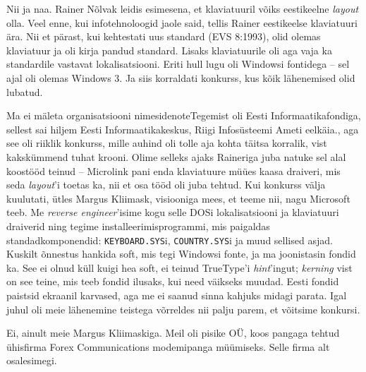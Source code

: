 
Nii ja naa. Rainer Nõlvak leidis esimesena, et klaviatuuril võiks eestikeelne \emph{layout} 
olla. Veel enne, kui infotehnoloogid jaole said, tellis Rainer eestikeelse 
klaviatuuri ära.  Nii et pärast, kui kehtestati  uus standard (EVS 8:1993),  
olid olemas klaviatuur ja oli kirja pandud standard. Lisaks klaviatuurile oli aga vaja ka standardile vastavat 
lokalisatsiooni. Eriti hull lugu oli Windowsi fontidega -- sel ajal oli olemas
Windows 3. Ja siis korraldati konkurss, kus kõik lähenemised 
olid lubatud.


Ma ei mäleta organisatsiooni nimesidenote{Tegemist oli Eesti Informaatikafondiga, sellest sai hiljem Eesti Informaatikakeskus, Riigi Infosüsteemi Ameti eelkäia.}, aga see oli riiklik 
konkurss, mille auhind oli tolle aja kohta täitsa korralik, vist kakskümmend 
tuhat krooni. Olime selleks ajaks Raineriga juba natuke sel alal 
koostööd teinud -- Microlink pani enda klaviatuure müües kaasa draiveri, mis seda 
\emph{layout}'i toetas ka, nii et osa tööd oli juba tehtud. Kui konkurss 
välja kuulutati, ütles Margus Kliimask, visiooniga mees,
et teeme nii, nagu Microsoft teeb. Me \emph{reverse 
engineer}'isime kogu selle DOSi lokalisatsiooni ja klaviatuuri draiverid ning 
tegime installeerimisprogrammi, mis paigaldas 
standadkomponendid: \verb|KEYBOARD.SYS|i, \verb|COUNTRY.SYS|i ja muud
sellised asjad. Kuskilt õnnestus hankida soft, mis tegi Windowsi 
fonte, ja ma joonistasin fondid ka. See ei olnud küll kuigi hea soft, 
ei teinud TrueType'i \emph{hint}'ingut; \emph{kerning} vist 
on see teine, mis teeb fondid ilusaks, kui need väikseks muudad. Eesti 
fondid paistsid ekraanil karvased, aga me ei saanud sinna kahjuks midagi parata. Igal juhul
oli meie lähenemine teistega võrreldes nii palju parem, et võitsime konkursi.


Ei, ainult meie Margus Kliimaskiga. 
Meil oli pisike OÜ, koos pangaga tehtud ühisfirma Forex Communications modemipanga müümiseks. 
Selle firma alt osalesimegi. 


